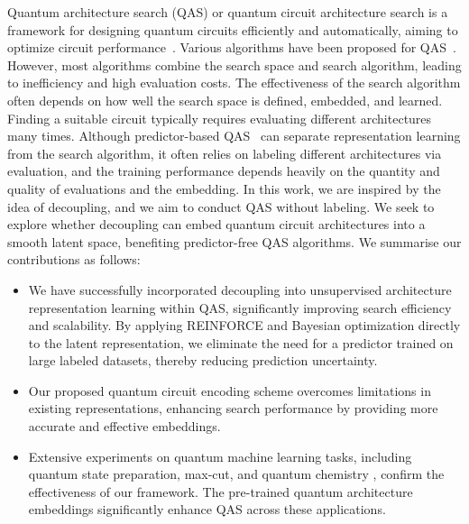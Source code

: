 \documentclass{article} %
\begin{document}
Quantum architecture search (QAS) or quantum circuit architecture search is a framework for designing quantum circuits efficiently and automatically, aiming to optimize circuit performance~\citep{du2022quantum}. Various algorithms have been proposed for QAS~\citep{zhang2022differentiable, du2022quantum, zhang2021neural, he2023gsqas, giovagnoli2023qneat}. However, most algorithms combine the search space and search algorithm, leading to inefficiency and high evaluation costs. The effectiveness of the search algorithm often depends on how well the search space is defined, embedded, and learned. Finding a suitable circuit typically requires evaluating different architectures many times. Although predictor-based QAS~\citet{he2023gsqas} can separate representation learning from the search algorithm, it often relies on labeling different architectures via evaluation, and the training performance depends heavily on the quantity and quality of evaluations and the embedding. In this work, we are inspired by the idea of decoupling, and we aim to conduct QAS without labeling. We seek to explore whether decoupling can embed quantum circuit architectures into a smooth latent space, benefiting predictor-free QAS algorithms.%
We summarise our contributions as follows:
\begin{itemize}[nolistsep]
\item We have successfully incorporated decoupling into unsupervised architecture representation learning within QAS, significantly improving search efficiency and scalability. By applying REINFORCE and Bayesian optimization directly to the latent representation, we eliminate the need for a predictor trained on large labeled datasets, thereby reducing prediction uncertainty.%
\item Our proposed quantum circuit encoding scheme overcomes limitations in existing representations, enhancing search performance by providing more accurate and effective embeddings.
\item Extensive experiments on quantum machine learning tasks, including quantum state preparation, max-cut, and quantum chemistry \citep{liang2019quantum, poljak1995solving, tilly2022variational}, confirm the effectiveness of our framework. The pre-trained quantum architecture embeddings significantly enhance QAS across these applications.
\end{itemize}
\end{document}
